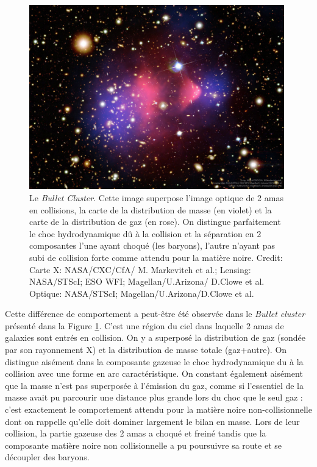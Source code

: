 \begin{figure}[htbp]
	\centering
		\includegraphics[height=8cm]{figs/bullet.jpg}
	\caption[Le \textit{Bullet Cluster}]{Le \textit{Bullet Cluster}. Cette image superpose l'image optique de 2 amas en collisions, la carte de la distribution de masse (en violet) et la carte de la distribution de gaz (en rose). On distingue parfaitement le choc hydrodynamique dû à la collision et la séparation en 2 composantes l'une ayant choqué (les baryons), l'autre n'ayant pas subi de collision forte comme attendu pour la matière noire.
Credit: Carte X: NASA/CXC/CfA/ M. Markevitch et al.;  Lensing: NASA/STScI; ESO WFI; Magellan/U.Arizona/ D.Clowe et al. Optique: NASA/STScI; Magellan/U.Arizona/D.Clowe et al.} 
	\label{f:bullet}
\end{figure}

Cette différence de comportement a peut-être été observée dans le \textit{Bullet cluster} présenté dans la Figure \ref{f:bullet}. C'est une région du ciel dans laquelle 2 amas de galaxies sont entrés en collision. On y a superposé la distribution de gaz (sondée par son rayonnement X) et la distribution de masse totale (gaz+autre). On distingue aisément dans la composante gazeuse le choc hydrodynamique du à la collision avec une forme en arc caractéristique. On constant également aisément que la masse n'est pas superposée à l'émission du gaz, comme si l'essentiel de la masse avait pu parcourir une distance plus grande lors du choc que le seul gaz : c'est exactement le comportement attendu pour la matière noire non-collisionnelle dont on rappelle qu'elle doit dominer largement le bilan en masse. Lors de leur collision, la partie gazeuse des 2 amas a choqué et freiné tandis que la composante matière noire non collisionnelle a pu poursuivre sa route et se découpler des baryons. 


